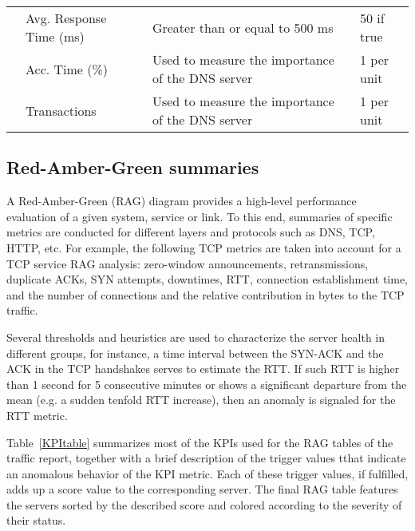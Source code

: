 \documentclass[AMA,STIX1COL]{WileyNJD-v2}
\begin{document}
\begin{table}[t]
\begin{tabular}{|C{1cm}|C{3.8cm}|C{7.5cm}|C{3.5cm}|}
                                                                                     & Avg. Response Time (ms)          & Greater than or equal to 500 ms                                                                                        & 50 if true                                    \\ 
                                                                                     & Acc. Time (\%)                   & Used to measure the importance of the DNS server                                                                       & 1 per unit                                    \\ 
                                                                                     & Transactions                     & Used to measure the importance of the DNS server                                                                       & 1 per unit                                    \\ \hline
\end{tabular}
\end{table}

\subsection{Red-Amber-Green summaries}

A Red-Amber-Green (RAG) diagram provides a high-level performance evaluation of a given system, service or link. To this end, summaries of specific metrics are conducted for different layers and protocols such as DNS, TCP, HTTP, etc. For example, the following TCP metrics are taken into account for a TCP service RAG analysis: zero-window announcements, retransmissions, duplicate ACKs, SYN attempts, downtimes, RTT, connection establishment time, and the number of connections and the relative contribution in bytes to the TCP traffic.

Several thresholds and heuristics are used to characterize the server health in different groups, for instance, a time interval between the SYN-ACK and the ACK in the TCP handshakes serves to estimate the RTT. If such RTT is higher than 1 second for 5 consecutive minutes or shows a significant departure from the mean (e.g. a sudden tenfold RTT increase), then an anomaly is signaled for the RTT metric. 

Table~\ref{KPItable} summarizes most of the KPIs used for the RAG tables of the traffic report, together with a brief description of the trigger values tthat indicate an anomalous behavior of the KPI metric. Each of these trigger values, if fulfilled, adds up a score value to the corresponding server. The final RAG table features the servers sorted by the described score and colored according to the severity of their status.
\end{document}
